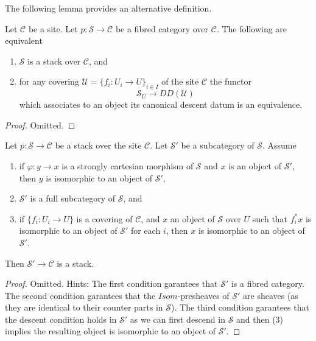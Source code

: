\medskip\noindent
The following lemma provides an alternative definition.

\begin{lemma}
\label{lemma-stack-equivalences}
Let $\mathcal{C}$ be a site.
Let $p : \mathcal{S} \to \mathcal{C}$ be a fibred category
over $\mathcal{C}$. The following are equivalent
\begin{enumerate}
\item $\mathcal{S}$ is a stack over $\mathcal{C}$, and
\item for any covering $\mathcal{U} = \{f_i : U_i \to U\}_{i \in I}$
of the site $\mathcal{C}$ the functor
$$
\mathcal{S}_U \longrightarrow DD(\mathcal{U})
$$
which associates to an
object its canonical descent datum is an equivalence.
\end{enumerate}
\end{lemma}

\begin{proof}
Omitted.
\end{proof}

\begin{lemma}
\label{lemma-substack}
Let $p : \mathcal{S} \to \mathcal{C}$ be a stack over the site $\mathcal{C}$.
Let $\mathcal{S}'$ be a subcategory of $\mathcal{S}$.
Assume
\begin{enumerate}
\item if $\varphi : y \to x$ is a strongly cartesian
morphism of $\mathcal{S}$ and
$x$ is an object of $\mathcal{S}'$, then $y$ is isomorphic to an
object of $\mathcal{S}'$,
\item $\mathcal{S}'$ is a full subcategory of $\mathcal{S}$, and
\item if $\{f_i : U_i \to U\}$ is a covering of $\mathcal{C}$,
and $x$ an object of $\mathcal{S}$ over $U$ such that $f_i^*x$
is isomorphic to an object of $\mathcal{S}'$ for each $i$,
then $x$ is isomorphic to an object of $\mathcal{S}'$.
\end{enumerate}
Then $\mathcal{S}' \to \mathcal{C}$ is a stack.
\end{lemma}

\begin{proof}
Omitted. Hints:
The first condition garantees that $\mathcal{S}'$ is a fibred category.
The second condition garantees that the $\mathit{Isom}$-presheaves
of $\mathcal{S}'$ are sheaves (as they are identical to their counter parts
in $\mathcal{S}$). The third condition garantees that the descent condition
holds in $\mathcal{S}'$ as we can first descend in $\mathcal{S}$ and
then (3) implies the resulting object is isomorphic to an object of
$\mathcal{S}'$.
\end{proof}

